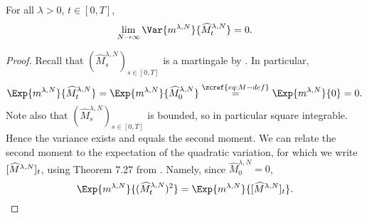 \documentclass{article}
\begin{document}
\begin{proposition}\label{prop:vanishing-variance}  %
For all $\lambda > 0$, $t \in [0,T]$,
\begin{equation}
    \lim_{N\to\infty} \Var{\lawmu^{\lambda,N}}{\widehat{M}_t^{\lambda,N}} = 0.
\end{equation}
\end{proposition}
\begin{proof}
Recall that $(\widehat{M}_s^{\lambda,N})_{s\in[0,T]}$ is a martingale by .
In particular,
\begin{equation}
    \Exp{\lawmu^{\lambda,N}}{\widehat{M}_t^{\lambda,N}} = \Exp{\lawmu^{\lambda,N}}{\widehat{M}_0^{\lambda,N}}
    \overset{\zcref{eq:M-def}}{=} \Exp{\lawmu^{\lambda,N}}{0} = 0.
\end{equation}
Note also that $(\widehat{M}_s^{\lambda,N})_{s\in[0,T]}$ is bounded, so in particular square integrable.
Hence the variance exists and equals the second moment.
We can relate the second moment to the expectation of the quadratic variation, for which we write $[\widehat{M}^{\lambda,N}]_t$, using Theorem 7.27 from \cite[201]{klebaner_introduction_2012}.
Namely, since $\widehat{M}_0^{\lambda,N} = 0$,
\begin{equation}
    \Exp{\lawmu^{\lambda,N}}{(\widehat{M}_t^{\lambda,N})^2} = \Exp{\lawmu^{\lambda,N}}{\sbr{\widehat{M}^{\lambda,N}}_t}.
\end{equation}


\end{proof}
\end{document}
